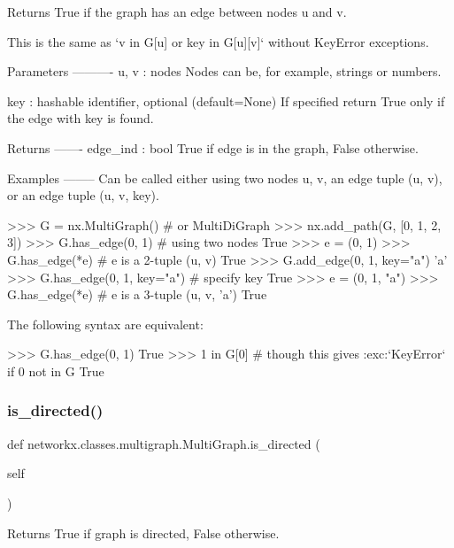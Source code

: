 \begin{DoxyVerb}Returns True if the graph has an edge between nodes u and v.

This is the same as `v in G[u] or key in G[u][v]`
without KeyError exceptions.

Parameters
----------
u, v : nodes
    Nodes can be, for example, strings or numbers.

key : hashable identifier, optional (default=None)
    If specified return True only if the edge with
    key is found.

Returns
-------
edge_ind : bool
    True if edge is in the graph, False otherwise.

Examples
--------
Can be called either using two nodes u, v, an edge tuple (u, v),
or an edge tuple (u, v, key).

>>> G = nx.MultiGraph()  # or MultiDiGraph
>>> nx.add_path(G, [0, 1, 2, 3])
>>> G.has_edge(0, 1)  # using two nodes
True
>>> e = (0, 1)
>>> G.has_edge(*e)  #  e is a 2-tuple (u, v)
True
>>> G.add_edge(0, 1, key="a")
'a'
>>> G.has_edge(0, 1, key="a")  # specify key
True
>>> e = (0, 1, "a")
>>> G.has_edge(*e)  # e is a 3-tuple (u, v, 'a')
True

The following syntax are equivalent:

>>> G.has_edge(0, 1)
True
>>> 1 in G[0]  # though this gives :exc:`KeyError` if 0 not in G
True\end{DoxyVerb}
 \mbox{\label{classnetworkx_1_1classes_1_1multigraph_1_1MultiGraph_a8e32791f2d1b790fe66d7e9df899778c}} 
\subsubsection{\texorpdfstring{is\+\_\+directed()}{is\_directed()}}
{\footnotesize\ttfamily def networkx.\+classes.\+multigraph.\+Multi\+Graph.\+is\+\_\+directed (\begin{DoxyParamCaption}\item[{}]{self }\end{DoxyParamCaption})}

\begin{DoxyVerb}Returns True if graph is directed, False otherwise.\end{DoxyVerb}
 \mbox{\label{classnetworkx_1_1classes_1_1multigraph_1_1MultiGraph_a4eb4204a4b136b33a6b1f7d73b744136}} 
